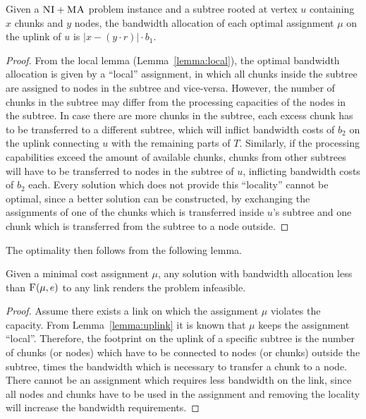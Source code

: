 \documentclass[9pt]{sigcomm-alternate}
\newcommand{\Problem}{\textsc{DummyName Problem}}
\newcommand{\maciek}[1]{\textcolor{brown}{maciek: #1}}
\newcommand{\MaFactor}{r}
\newcommand{\VmChunkAssignment}{\mu}
\newcommand{\SubstrateEdge}{\ensuremath{e}}
\newcommand{\CC}{\textsc{NI}}
\newcommand{\MA}{\textsc{MA}}
\newcommand{\Cost}{\textsc{F}}
\newcommand{\Tree}{\ensuremath{T}}
\newcommand{\CostTrans}{\ensuremath{b_1}}
\newcommand{\CostCom}{\ensuremath{b_2}}
\newcommand{\Sol}{\ensuremath{SOL}}
\begin{document}
\begin{lemma}
Given a $\CC+\MA$ problem instance and a subtree rooted at vertex $u$ containing $x$
chunks and $y$ nodes, the bandwidth allocation of each optimal assignment
$\VmChunkAssignment$ on the uplink of $u$ is $|x-(y\cdot\MaFactor)|\cdot
\CostTrans$.
\label{lemma:uplink}
\end{lemma}
\begin{proof}
From the local lemma (Lemma~\ref{lemma:local}), 
the optimal bandwidth allocation is given by 
a ``local'' assignment, in which all chunks inside the
subtree are assigned to nodes in the subtree and vice-versa. However, the
number of chunks in the subtree may differ from the processing capacities of
the nodes in the subtree. In case there are more chunks in the subtree, each
excess chunk has to be transferred to a different subtree, which will
inflict bandwidth costs of $\CostCom$ on the uplink connecting $u$ with the
remaining parts of $\Tree$. Similarly, if the processing capabilities exceed the amount of
available chunks, chunks from other subtrees will have to be transferred to
nodes in the subtree of $u$, inflicting bandwidth costs of $\CostCom$ each. 
Every solution
which does not provide this ``locality'' cannot be optimal, since a better
solution can be constructed, by exchanging the assignments of one of the chunks
which is transferred inside $u$'s subtree and one chunk which is transferred from
the subtree to a node outside.
\end{proof}

The optimality then follows from the following lemma.
\begin{lemma}
Given a minimal cost assignment $\VmChunkAssignment$, 
any solution with bandwidth allocation less
than $\Cost(\VmChunkAssignment,
\SubstrateEdge)$ to any link renders the problem
infeasible.
\label{lemma:no_bandwidth}
\end{lemma}
\begin{proof}
Assume there exists a link on which the assignment $\VmChunkAssignment$
violates the capacity. From Lemma~\ref{lemma:uplink} it is
known that $\VmChunkAssignment$ keeps the assignment ``local''. 
Therefore, the footprint on the uplink of a specific subtree is the number of chunks
(or nodes) which have to be connected to nodes (or chunks) outside the subtree,
times the bandwidth which is necessary to transfer a chunk to a node. There
cannot be an assignment which requires less bandwidth on the link, since all nodes
and chunks have to be used in the assignment and removing the
locality will increase the bandwidth requirements.
\end{proof}
%
%
\end{document}
